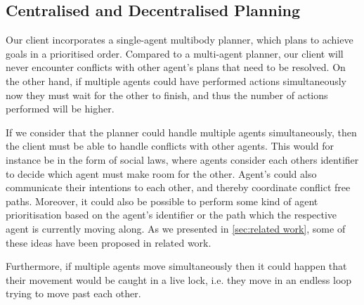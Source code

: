 \subsection{Centralised and Decentralised Planning}

Our client incorporates a single-agent multibody planner, which plans to achieve goals in a prioritised order.
Compared to a multi-agent planner, our client will never encounter conflicts with other agent's plans that need to be resolved.
On the other hand, if multiple agents could have performed actions simultaneously now they must wait for the other to finish, and thus the number of actions performed will be higher.

If we consider that the planner could handle multiple agents simultaneously, then the client must be able to handle conflicts with other agents.
This would for instance be in the form of social laws, where agents consider each others identifier to decide which agent must make room for the other.
Agent's could also communicate their intentions to each other, and thereby coordinate conflict free paths.
Moreover, it could also be possible to perform some kind of agent prioritisation based on the agent's identifier or the path which the respective agent is currently moving along.
As we presented in \cref{sec:related work}, some of these ideas have been proposed in related work.

Furthermore, if multiple agents move simultaneously then it could happen that their movement would be caught in a live lock, i.e. they move in an endless loop trying to move past each other.

